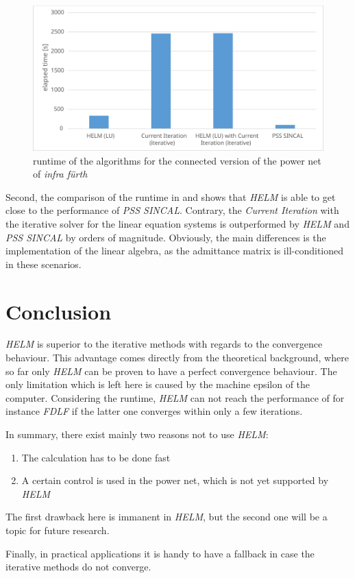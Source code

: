 \begin{figure}
	\centering
	\includegraphics[scale=0.7]{figures/big_net_combined_runtime}
	\caption[Comparison, \emph{infra fürth}, connected, runtime]{runtime of the algorithms for the connected version of the power net of \emph{infra fürth}}
	\label{fig:big_net_combined_runtime}
\end{figure}

Second, the comparison of the runtime in  and  shows that \emph{HELM} is able to get close to the performance of \emph{PSS SINCAL}. Contrary, the \emph{Current Iteration} with the iterative solver for the linear equation systems is outperformed by \emph{HELM} and \emph{PSS SINCAL} by orders of magnitude. Obviously, the main differences is the implementation of the linear algebra, as the admittance matrix is ill-conditioned in these scenarios.

\section{Conclusion}
\emph{HELM} is superior to the iterative methods with regards to the convergence behaviour. This advantage comes directly from the theoretical background, where so far only \emph{HELM} can be proven to have a perfect convergence behaviour. The only limitation which is left here is caused by the machine epsilon of the computer. Considering the runtime, \emph{HELM} can not reach the performance of for instance \emph{FDLF} if the latter one converges within only a few iterations.

In summary, there exist mainly two reasons not to use \emph{HELM}:
\begin{enumerate}
	\item The calculation has to be done fast
	\item A certain control is used in the power net, which is not yet supported by \emph{HELM}
\end{enumerate}
The first drawback here is immanent in \emph{HELM}, but the second one will be a topic for future research.

Finally, in practical applications it is handy to have a fallback in case the iterative methods do not converge.